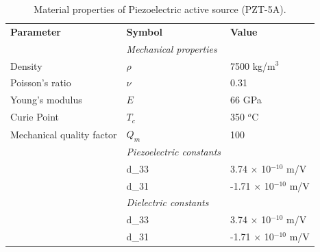 \documentclass[preprint,3p, 11pt,authoryear]{elsarticle}
\begin{document}
\begin{table}[ht]
	\centering
	\caption{Material properties of Piezoelectric active source (PZT-5A).}
	\begin{tabular}{ m{5cm} m{2cm} m{4cm}} 
		\hline  
		\bf{Parameter} 		      & \bf{Symbol} 	  & \bf{Value}	\\
	   & \textit{Mechanical properties} & \\
	    Density                   & $\rho$            & 7500 kg/m$^{3}$\\
	    Poisson's ratio           & $\nu$             & 0.31\\
	    Young's modulus           & $E$               & 66 GPa\\
        Curie Point               & $T_{c}$           & 350 $^{o}$C\\  
        Mechanical quality factor &   $Q_{m}$         & 100\\
	  & \textit{Piezoelectric constants} & \\
 	  & d_{33}                   & 3.74 $\times$ 10$^{-10}$ m/V\\
 	  & d_{31}                   & -1.71 $\times$ 10$^{-10}$ m/V\\
	  & \textit{Dielectric constants} & \\
 	  & d_{33}                   & 3.74 $\times$ 10$^{-10}$ m/V\\
 	  & d_{31}                   & -1.71 $\times$ 10$^{-10}$ m/V\\

	       
		\hline  	
	\end{tabular}
	\label{table1}
\end{table}
\end{document}
